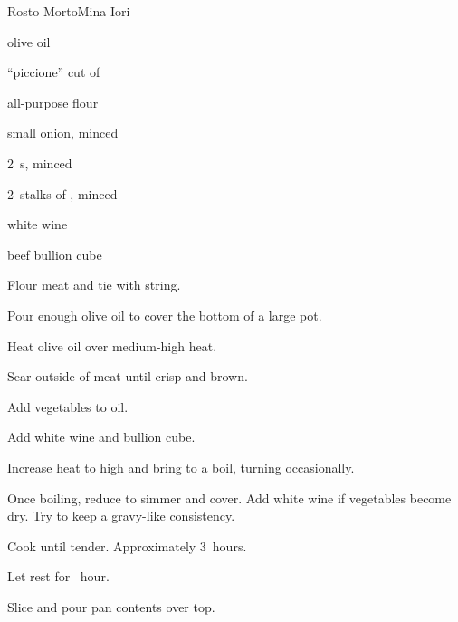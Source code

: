 \begin{recipe}{Rosto Morto}{Mina Iori}{}

\begin{ingredients}
\item olive oil
\item \kgr{1\half} ``piccione'' cut of 
\item all-purpose flour
\item small onion, minced
\item 2~s, minced
\item 2~stalks of , minced
\item white wine
\item beef bullion cube
\end{ingredients}

\begin{directions}
\item Flour meat and tie with string.
\item Pour enough olive oil to cover the bottom of a large pot.
\item Heat olive oil over medium-high heat.
\item Sear outside of meat until crisp and brown.
\item Add vegetables to oil.
\item Add white wine and bullion cube.
\item Increase heat to high and bring to a boil, turning occasionally.
\item Once boiling, reduce to simmer and cover. Add white wine if vegetables become dry. Try to keep a gravy-like consistency.
\item Cook until tender. Approximately 3~hours.
\item Let rest for \half~hour.
\item Slice and pour pan contents over top.
\end{directions}

\end{recipe}
